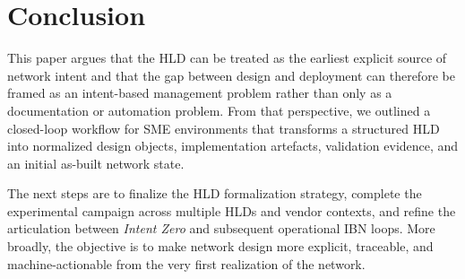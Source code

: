 \documentclass[conference]{IEEEtran}
\begin{document}
\section{Conclusion}

This paper argues that the HLD can be treated as the earliest explicit source of network intent and that the gap between design and deployment can therefore be framed as an intent-based management problem rather than only as a documentation or automation problem. From that perspective, we outlined a closed-loop workflow for SME environments that transforms a structured HLD into normalized design objects, implementation artefacts, validation evidence, and an initial as-built network state.

The next steps are to finalize the HLD formalization strategy, complete the experimental campaign across multiple HLDs and vendor contexts, and refine the articulation between \emph{Intent Zero} and subsequent operational IBN loops. More broadly, the objective is to make network design more explicit, traceable, and machine-actionable from the very first realization of the network.




\end{document}
